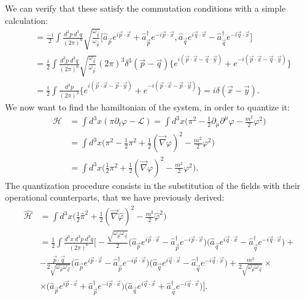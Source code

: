 We can verify that these satisfy the commutation conditions with a simple calculation:
\begin{align*}
    [\hat{\varphi}_i(\vec x), \hat{\pi}^j(\vec y)]&=\frac{-i}{2}\int\frac{d^3p\ d^3q}{(2\pi)^6}\sqrt{\frac{\omega_{\vec{q}}}{\omega_{\vec{p}}}} \bigg[\hat{a}_{\vec{p}}e^{i\vec p\cdot \vec x}+\hat{a}_{\vec{p}}^\dagger e^{-i\vec p\cdot \vec x},\hat{a}_{\vec{q}}e^{i\vec q\cdot \vec x}-\hat{a}_{\vec{q}}^\dagger e^{-i\vec q\cdot \vec x}\bigg]\\&=\frac{i}{2}\int\frac{d^3p\ d^3q}{(2\pi)^6}\sqrt{\frac{\omega_{\vec{q}}}{\omega_{\vec{p}}}} (2\pi)^3\delta^3(\vec p-\vec q)\bigg\{e^{i(\vec p\cdot \vec x-\vec q\cdot\vec y)}+e^{-i(\vec p\cdot \vec x-\vec q\cdot\vec y)}\bigg\}\\&=\frac{i}{2}\int\frac{d^3p}{(2\pi)^3}\bigg\{e^{i(\vec p\cdot \vec x-\vec p\cdot\vec y)}+e^{-i(\vec p\cdot \vec x-\vec p\cdot\vec y)}\bigg\}=i\delta(\vec x-\vec y).
\end{align*}
We now want to find the hamiltonian of the system, in order to quantize it:
\begin{align*}
    \mathcal{H} &=\int d^3x (\pi\partial_t\varphi-\mathcal{L})=\int d^3x \bigg(\pi^2-\frac{1}{2}\partial_\mu\partial^\mu\varphi-\frac{m^2}{2}\varphi^2\bigg)\\&=\int d^3x \bigg(\pi^2-\frac{1}{2}\pi^2+\frac{1}{2}(\vec\nabla\varphi)^2-\frac{m^2}{2}\varphi^2\bigg)\\&=\int d^3x \bigg(\frac{1}{2}\pi^2+\frac{1}{2}(\vec\nabla\varphi)^2-\frac{m^2}{2}\varphi^2\bigg).
\end{align*}
The quantization procedure consists in the substitution of the fields with their operational counterparts, that we have previously derived:
\begin{align*}
    \hat{\mathcal{H}} &=\int d^3x \bigg(\frac{1}{2}\hat{\pi}^2+\frac{1}{2}(\vec\nabla\hat{\varphi})^2-\frac{m^2}{2}\hat{\varphi}^2\bigg)\\&=\frac{1}{2}\int\frac{d^3x\ d^3p\ d^3q}{(2\pi)^6}\bigg[-\frac{\sqrt{\omega_{\vec{p}}\omega_{\vec{q}}}}{2}\bigg(\hat{a}_{\vec{p}}e^{i\vec p\cdot \vec x}-\hat{a}_{\vec{p}}^\dagger e^{-i\vec p\cdot \vec x}\bigg)\bigg(\hat{a}_{\vec{q}}e^{i\vec q\cdot \vec x}-\hat{a}_{\vec{q}}^\dagger e^{-i\vec q\cdot \vec x}\bigg)+\\&-\frac{\vec p\cdot\vec q}{2\sqrt{\omega_{\vec p}\omega_{\vec q}}}\bigg(\hat{a}_{\vec{p}}e^{i\vec p\cdot \vec x}-\hat{a}_{\vec{p}}^\dagger e^{-i\vec p\cdot \vec x}\bigg)\bigg(\hat{a}_{\vec{q}}e^{i\vec q\cdot \vec x}-\hat{a}_{\vec{q}}^\dagger e^{-i\vec q\cdot \vec x}\bigg)+\frac{m^2}{2\sqrt{\omega_{\vec p}\omega_{\vec q}}}\times\\&\times\bigg(\hat{a}_{\vec{p}}e^{i\vec p\cdot \vec x}+\hat{a}_{\vec{p}}^\dagger e^{-i\vec p\cdot \vec x}\bigg)\bigg(\hat{a}_{\vec{q}}e^{i\vec q\cdot \vec x}+\hat{a}_{\vec{q}}^\dagger e^{-i\vec q\cdot \vec x}\bigg)\bigg] .
\end{align*}

